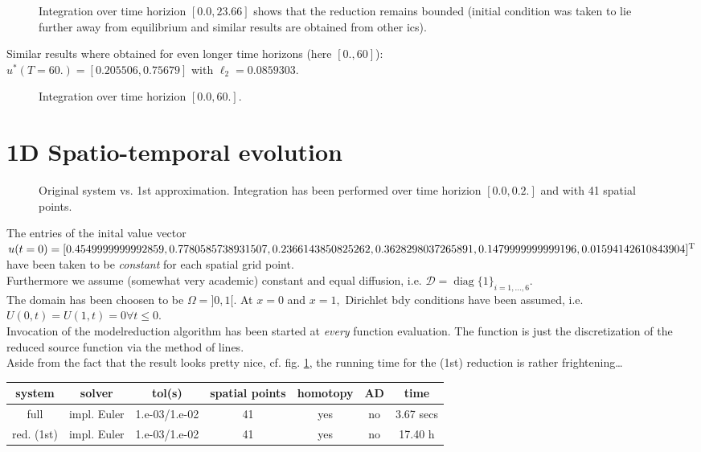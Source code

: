 \documentclass[11pt,a4paper]{article}
\newcommand{\trans}{^{\operatorname{T}}}
\newcommand{\diag}{\operatorname{diag}}
\begin{document}
\begin{figure}
  \caption{Integration over time horizion $[0.0, 23.66]$ shows that the reduction remains bounded (initial condition was taken to lie further away from equilibrium and similar results are obtained from other ics).}
\end{figure}

Similar results where obtained for even longer time horizons (here $[0., 60]$):\\
$u^*(T=60.) = [ 0.205506, 0.75679 ]$ with $\ell_2 = 0.0859303.$
\begin{figure}
  \caption{Integration over time horizion $[0.0, 60.]$.}
\end{figure}


\section{1D Spatio-temporal evolution}

\begin{figure}
  \caption{Original system vs. 1st approximation. Integration has been performed over time horizion $[0.0, 0.2.]$ and with 41 spatial points.}
  \label{fig:diff1d}
\end{figure}

The entries of the inital value vector \\$u(t=0) = [0.4549999999992859, 0.7780585738931507, 0.2366143850825262, \\0.3628298037265891, 0.1479999999999196, 0.01594142610843904]\trans $ have been taken to be \textit{constant} for each spatial grid point.\\Furthermore we assume (somewhat very academic) constant and equal diffusion, i.e. $\mathcal{D} = \diag\{1\}_{i=1,\ldots,6}$. \\
The domain has been choosen to be $\Omega = ]0,1[.$ At $x = 0$ and $x = 1,$ Dirichlet bdy conditions have been assumed, i.e. $U(0,t) = U(1,t) = 0 \forall t \leq 0.$ \\
Invocation of the modelreduction algorithm has been started at \textit{every} function evaluation. The function is just the discretization of the reduced source function via the method of lines.\\
Aside from the fact that the result looks pretty nice, cf. fig. \ref{fig:diff1d}, the running time for the (1st) reduction is rather frightening\ldots

\begin{center}
\begin{tabular}{|c|c|c|c|c|c|c|}
  \hline
 \textbf{system} & \textbf{solver} & \textbf{tol(s)} & \textbf{spatial points} & \textbf{homotopy} &  \textbf{AD} & \textbf{time}  \\
\hline \hline
full & impl. Euler & 1.e-03/1.e-02 & 41 & yes & no& 3.67 secs \\
red. (1st) & impl. Euler& 1.e-03/1.e-02 & 41 & yes & no& 17.40 h\\

\hline
\end{tabular}
\end{center}
\end{document}
